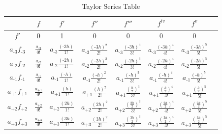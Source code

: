 \begin{table}[htbp]
	\centering
	\caption{Taylor Series Table}
		\begin{tabular}{c|c|c|c|c|c|c|c} %
			\textbf{}          &\textbf{$f$} & \textbf{$f'$}            & \textbf{$f''$}                                 & \textbf{$f'''$}                                 & \textbf{$f^{iv}$}                             & \textbf{$f^{v}$}                                \\
			\hline
			$f'$                                     & 0                                     & 1                                                       &                                                    0       &                                                              0&                                                      0&                                                                     0&\\
			$a_{\text{-}3}f_{\text{-}3}$& $\frac{a_{\text{-}3}}{0!}$ &$a_{\text{-}3}\frac{(\text{-}3h)}{1!}$ &$a_{\text{-}3}\frac{(\text{-}3h)^2}{2!}$  &$a_{\text{-}3}\frac{(\text{-}3h)^3}{3!}$   &$a_{\text{-}3}\frac{(\text{-}3h)^4}{4!}$    &$a_{\text{-}3}\frac{(\text{-}3h)^5}{5!}$   &\\ 
			$a_{\text{-}2}f_{\text{-}2}$& $\frac{a_{\text{-}2}}{0!}$ &$a_{\text{-}2}\frac{(\text{-}2h)}{1!}$ &$a_{\text{-}2}\frac{(\text{-}2h)^2}{2!}$  &$a_{\text{-}2}\frac{(\text{-}2h)^3}{3!}$   &$a_{\text{-}2}\frac{(\text{-}2h)^4}{4!}$    &$a_{\text{-}2}\frac{(\text{-}2h)^5}{5!}$   &\\
			$a_{\text{-}1}f_{\text{-}1}$& $\frac{a_{\text{-}1}}{0!}$ &$a_{\text{-}1}\frac{(\text{-}h)}{1!}$   &$a_{\text{-}1}\frac{(\text{-}h)^2}{2!}$    &$a_{\text{-}1}\frac{(\text{-}h  )^3}{3!}$   &$a_{\text{-}1}\frac{(\text{-}h )^4}{4!}$     &$a_{\text{-}1}\frac{(\text{-}h )^5}{5!}$    &\\
			$a_{+1}f_{+1}$                   & $\frac{a_{+1}}{0!}$           &$a_{+1}\frac{(h)}{1!}$                         &$a_{+1}\frac{(h)^2}{2!}$                         &$a_{+1}\frac{(\frac{h}{2})^3 }{3!}$           &$a_{+1}\frac{(\frac{h}{2})         ^4}{4!}$     &$a_{+1}\frac{(\frac{h}{2})^5}{5!}$             &\\
			$a_{+2}f_{+2}$                   & $\frac{a_{+2}}{0!}$           &$a_{+2}\frac{(2h)}{1!}$                       &$a_{+2}\frac{(2h)^2}{2!}$                       &$a_{+2}\frac{(\frac{2h}{2})^3}{3!}$          &$a_{+2}\frac{(\frac{2h}{2})       ^4}{4!}$     &$a_{+2}\frac{(\frac{2h}{2})^5}{5!}$           &\\
			$a_{+3}f_{+3}$                  & $\frac{a_{+3}}{0!}$            &$a_{+3}\frac{(3h)}{1!}$                       &$a_{+3}\frac{(3h)^2}{2!}$                       &$a_{+3}\frac{(\frac{3h}{2})^3}{3!}$          &$a_{+3}\frac{(\frac{3h}{2})       ^4}{4!}$     &$a_{+3}\frac{(\frac{3h}{2})^5}{5!}$           &\\
		\end{tabular}
		\label{tab:findiff}
\end{table}

